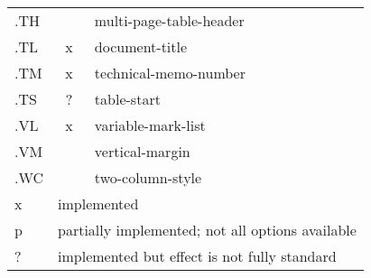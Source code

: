 \begin{center}
\begin{tabular}{|l|c|l|}
.TH&	&		multi-page-table-header\\
.TL&	x&		document-title\\
.TM&	x&		technical-memo-number\\
.TS&	?&		table-start\\
.VL&	x&		variable-mark-list\\
.VM&	&		vertical-margin\\
.WC&	&		two-column-style\\
\hline
\hline
x&\multicolumn{2}{|l|}{implemented}\\
p&\multicolumn{2}{|l|}{partially implemented; not all options available}\\
?&\multicolumn{2}{|l|}{implemented but effect is not fully standard}\\
\hline
\end{tabular}\end{center}
\medskip

